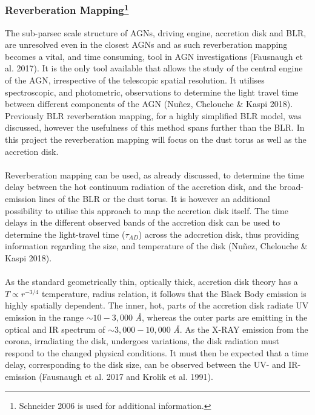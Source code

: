 \documentclass[a4paper, 12pt, twoside]{article}
\begin{document}
\subsubsection[Reverberation Mapping]{Reverberation Mapping\footnote{Schneider 2006 is used for additional information.}}
The sub-parsec scale structure of AGNs, driving engine, accretion disk and BLR, are unresolved even in the closest AGNs and as such reverberation mapping becomes a vital, and time consuming, tool in AGN investigations (Fausnaugh et al. 2017). It is the only tool available  that allows the study of the central engine of the AGN, irrespective of the telescopic spatial resolution. It utilises spectroscopic, and photometric, observations to determine the light travel time between different components of the AGN (Nuñez, Chelouche \& Kaspi 2018). Previously BLR reverberation mapping, for a highly simplified BLR model, was discussed, however the usefulness of this method spans further than the BLR. In this project the reverberation mapping will focus on the dust torus as well as the accretion disk. \\
\\
Reverberation mapping can be used, as already discussed, to determine the time delay between the hot continuum radiation of the accretion disk, and the broad-emission lines of the BLR or the dust torus. It is however an additional possibility to utilise this approach to map the accretion disk itself. The time delays in the different observed bands of the accretion disk can be used to determine the light-travel time ($\tau_{AD}$) across the adccretion disk, thus providing information regarding the size, and temperature of the disk (Nuñez, Chelouche \& Kaspi 2018). \\
\\
As the standard geometrically thin, optically thick, accretion disk theory has a $T \propto r^{-3/4}$ temperature, radius relation, it follows that the Black Body emission is highly spatially dependent. The inner, hot, parts of the accretion disk radiate UV emission in the range $\sim 10-3,000$ \emph{Å}, whereas the outer parts are emitting in the optical and IR spectrum of $\sim 3,000-10,000$ \emph{Å}. As the X-RAY emission from the corona, irradiating the disk, undergoes variations, the disk radiation must respond to the changed physical conditions. It must then be expected that a time delay, corresponding to the disk size, can be observed between the UV- and IR-emission (Fausnaugh et al. 2017 and Krolik et al. 1991). 
\end{document}
